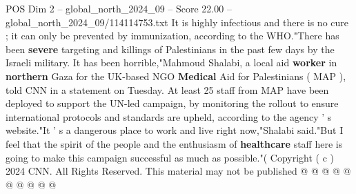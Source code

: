 \begin{textsample}{POS Dim 2 – global\_north\_2024\_09 – Score 22.00 – global\_north\_2024\_09/114114753.txt}
It is highly infectious and there is no cure ; it can only be prevented by immunization, according to the WHO."There has been \textbf{severe} targeting and killings of Palestinians in the past few days by the Israeli military.
It has been horrible,"Mahmoud Shalabi, a local aid \textbf{worker} in \textbf{northern} Gaza for the UK-based NGO \textbf{Medical} Aid for Palestinians ( MAP ), told CNN in a statement on Tuesday.
At least 25 staff from MAP have been deployed to support the UN-led campaign, by monitoring the rollout to ensure international protocols and standards are upheld, according to the agency ' s website."It ' s a dangerous place to work and live right now,"Shalabi said."But I feel that the spirit of the people and the enthusiasm of \textbf{healthcare} staff here is going to make this campaign successful as much as possible."( Copyright ( c ) 2024 CNN.
All Rights Reserved.
This material may not be published @ @ @ @ @ @ @ @ @ @

\end{textsample}
